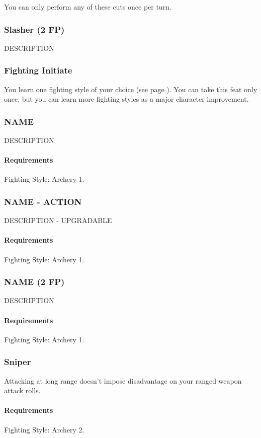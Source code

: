     You can only perform any of these cuts once per turn.
\subsubsection{Slasher (2 FP)} \label{feat::slasher}
    DESCRIPTION

\subsubsection{Fighting Initiate} \label{feat::fightinginitiate}
    You learn one fighting style of your choice (see page \pageref{ssec::fightingstyles}).
    You can take this feat only once, but you can learn more fighting styles as a major character improvement.
\subsubsection{NAME} \label{feat::name}
    DESCRIPTION
    \paragraph{Requirements} Fighting Style: Archery 1.
\subsubsection{NAME - ACTION} \label{feat::name}
    DESCRIPTION - UPGRADABLE
    \paragraph{Requirements} Fighting Style: Archery 1.
\subsubsection{NAME (2 FP)} \label{feat::name}
    DESCRIPTION
    \paragraph{Requirements} Fighting Style: Archery 1.
\subsubsection{Sniper} \label{feat::sniper}
    Attacking at long range doesn't impose disadvantage on your ranged weapon attack rolls.
    \paragraph{Requirements} Fighting Style: Archery 2.
